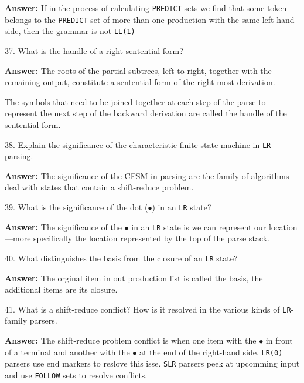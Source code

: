 \vskip 3mm
{\bf Answer:} If in the process of calculating {\tt PREDICT} sets we find that some token belongs to the {\tt PREDICT} set of more than one production with the same left-hand side, then the grammar is not {\tt LL(1)}

\filbreak
\vskip 1cm

37. What is the handle of a right sentential form?

\vskip 3mm
{\bf Answer:} The roots of the partial subtrees, left-to-right, together with the remaining output, constitute a sentential form of the right-most derivation.

\vskip 1mm
 The symbols that need to be joined together at each step of the parse to represent the next step of the backward derivation are called the handle of the sentential form.

\filbreak
\vskip 1cm

38. Explain the significance of the characteristic finite-state machine in {\tt LR} parsing.

\vskip 3mm
{\bf Answer:} The significance of the CFSM in parsing are the family of algorithms deal with  states that contain a shift-reduce problem.

\filbreak
\vskip 1cm

39. What is the significance of the dot ($\bullet$) in an {\tt LR} state?

\vskip 3mm
{\bf Answer:} The significance of the $\bullet$ in an {\tt LR} state is we can represent our location---more specifically the location represented by the top of the parse stack.

\filbreak
\vskip 1cm

40. What distinguishes the basis from the closure of an {\tt LR} state?

\vskip 3mm
{\bf Answer:} The orginal item in out production list is called the basis, the additional items are its closure.

\filbreak
\vskip 1cm

41. What is a shift-reduce conflict? How is it resolved in the various kinds of {\tt LR}-family parsers.

\vskip 3mm
{\bf Answer:} The shift-reduce problem conflict is when one item with the $\bullet$ in front of a terminal and another with the $\bullet$ at the end of the right-hand side. {\tt LR(0)} parsers use end markers to reslove this isse. {\tt SLR} parsers peek at upcomming input and use {\tt FOLLOW} sets to resolve conflicts.

\filbreak
\vskip 1cm

